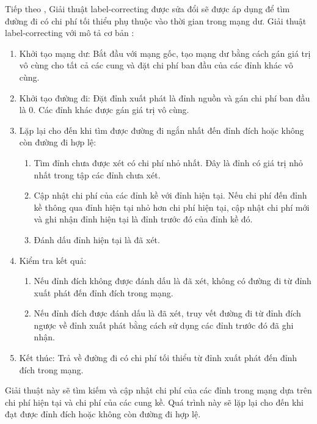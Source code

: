 \documentclass[a4paper]{article}
\begin{document}
Tiếp theo , Giải thuật label-correcting được sửa đổi sẽ được áp dụng để tìm đường đi có chi phí tối thiểu phụ thuộc vào thời gian trong mạng dư. Giải thuật label-correcting với mô tả cơ bản : 
\setlength{\parindent}{20pt}
\begin{enumerate}
  \item Khởi tạo mạng dư: Bắt đầu với mạng gốc, tạo mạng dư bằng cách gán giá trị vô cùng cho tất cả các cung và đặt chi phí ban đầu của các đỉnh khác vô cùng. 
  \item Khởi tạo đường đi: Đặt đỉnh xuất phát là đỉnh nguồn và gán chi phí ban đầu là 0. Các đỉnh khác được gán giá trị vô cùng.
  \item Lặp lại cho đến khi tìm được đường đi ngắn nhất đến đỉnh đích hoặc không còn đường đi hợp lệ:
    \begin{enumerate}[label=\textbf{\alph*.}]
  \item Tìm đỉnh chưa được xét có chi phí nhỏ nhất. Đây là đỉnh có giá trị nhỏ nhất trong tập các đỉnh chưa xét. 
  \item Cập nhật chi phí của các đỉnh kề với đỉnh hiện tại. Nếu chi phí đến đỉnh kề thông qua đỉnh hiện tại nhỏ hơn chi phí hiện tại, cập nhật chi phí mới và ghi nhận đỉnh hiện tại là đỉnh trước đó của đỉnh kề đó.
  \item Đánh dấu đỉnh hiện tại là đã xét.
    \end{enumerate}
   \item Kiểm tra kết quả:
   \begin{enumerate}[label=\textbf{\alph*.}]
  \item Nếu đỉnh đích không được đánh dấu là đã xét, không có đường đi từ đỉnh xuất phát đến đỉnh đích trong mạng. 
  \item Nếu đỉnh đích được đánh dấu là đã xét, truy vết đường đi từ đỉnh đích ngược về đỉnh xuất phát bằng cách sử dụng các đỉnh trước đó đã ghi nhận.
    \end{enumerate}
   \item Kết thúc: Trả về đường đi có chi phí tối thiểu từ đỉnh xuất phát đến đỉnh đích trong mạng. 
\end{enumerate}

Giải thuật này sẽ tìm kiếm và cập nhật chi phí của các đỉnh trong mạng dựa trên chi phí hiện tại và chi phí của các cung kề. Quá trình này sẽ lặp lại cho đến khi đạt được đỉnh đích hoặc không còn đường đi hợp lệ. 
\end{document}
